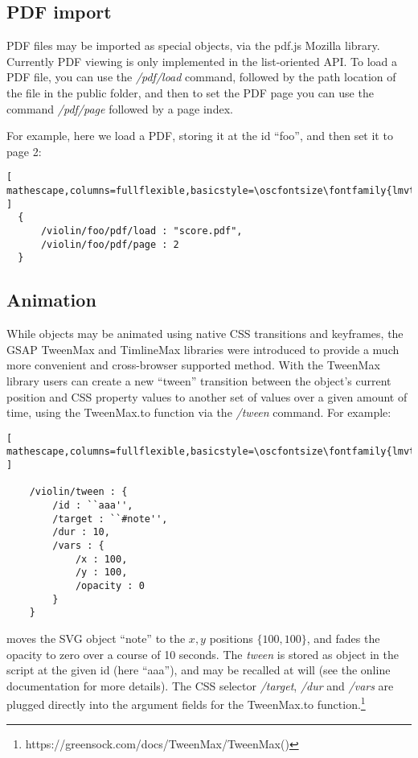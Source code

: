 \subsection{PDF import}\label{sec:pdf}
PDF files may be imported as special \drawsocket objects, via the pdf.js Mozilla library.
Currently PDF viewing is only implemented in the list-oriented API. 
To load a PDF file, you can use the \textit{/pdf/load} command, followed by the path location of the file in the public folder, and then to set the PDF page you can use the command \textit{/pdf/page} followed by a page index.

For example, here we load a PDF, storing it at the \drawsocket id ``foo'', and then set it to page 2:

\begin{lstlisting}[ mathescape,columns=fullflexible,basicstyle=\oscfontsize\fontfamily{lmvtt}\selectfont ]
  {
      /violin/foo/pdf/load : "score.pdf",
      /violin/foo/pdf/page : 2
  }
 \end{lstlisting}


\subsection{Animation}\label{sec:animation}
While \drawsocket objects may be animated using native CSS transitions and keyframes, the GSAP TweenMax and TimlineMax libraries were introduced to provide a much more convenient and cross-browser supported method.
With the TweenMax library users can create a new ``tween'' transition between the object's current position and CSS property values to another set of values over a given amount of time, using the TweenMax.to function via the \textit{/tween} \drawsocket command. For example:
\begin{lstlisting}[ mathescape,columns=fullflexible,basicstyle=\oscfontsize\fontfamily{lmvtt}\selectfont ]

    /violin/tween : {
        /id : ``aaa'',
        /target : ``#note'', 
        /dur : 10,
        /vars : {
            /x : 100,
            /y : 100,
            /opacity : 0
        }
    }
 \end{lstlisting}
\noindent
moves the SVG object ``note'' to the ${x,y}$ positions $\{100,100\}$, and fades the opacity to zero over a course of 10 seconds.
The \textit{tween} is stored as object in the \drawsocket script at the given id (here ``aaa''), and may be recalled at will (see the online documentation for more details).
The CSS selector \textit{/target}, \textit{/dur} and \textit{/vars} are plugged directly into the argument fields for the TweenMax.to function.\footnote{https://greensock.com/docs/TweenMax/TweenMax()}

